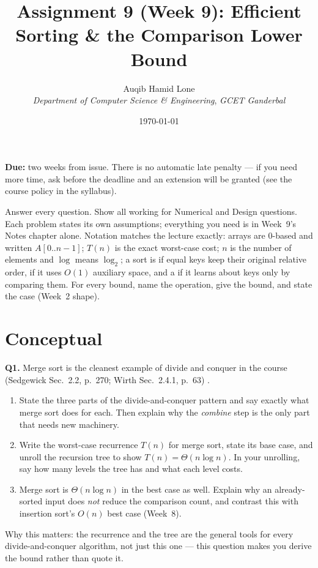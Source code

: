 \documentclass[11pt]{article}
\title{Assignment 9 (Week 9): Efficient Sorting \& the Comparison Lower Bound}
\author{Auqib Hamid Lone\\[0.3em]
  \emph{Department of Computer Science \& Engineering}, \emph{GCET Ganderbal}}
\date{\today}
\begin{document}
\maketitle

\noindent\textbf{Due:} two weeks from issue. There is no automatic late penalty --- if you need more time, ask before the deadline and an extension will be granted (see the course policy in the syllabus).

\noindent Answer every question. Show all working for Numerical and Design questions. Each problem states its own assumptions; everything you need is in Week~9's Notes chapter alone. Notation matches the lecture exactly: arrays are 0-based and written $A[0..n-1]$; $T(n)$ is the exact worst-case cost; $n$ is the number of elements and $\log$ means $\log_2$; a sort is  if equal keys keep their original relative order,  if it uses $O(1)$ auxiliary space, and a  if it learns about keys only by comparing them. For every bound, name the operation, give the bound, and state the case (Week~2 shape).

\section{Conceptual}

\textbf{Q1.} Merge sort is the cleanest example of divide and conquer in the course (Sedgewick Sec.~2.2, p.~270; Wirth Sec.~2.4.1, p.~63) \cite{Sedgewick2011_algorithms,Wirth2004_algorithms_data_structures}.
\begin{enumerate}
  \item[(a)] State the three parts of the divide-and-conquer pattern and say exactly what merge sort does for each. Then explain why the \emph{combine} step is the only part that needs new machinery.
  \item[(b)] Write the worst-case recurrence $T(n)$ for merge sort, state its base case, and unroll the recursion tree to show $T(n)=\Theta(n\log n)$. In your unrolling, say how many levels the tree has and what each level costs.
  \item[(c)] Merge sort is $\Theta(n\log n)$ in the best case as well. Explain why an already-sorted input does \emph{not} reduce the comparison count, and contrast this with insertion sort's $O(n)$ best case (Week~8).
\end{enumerate}
Why this matters: the recurrence and the tree are the general tools for every divide-and-conquer algorithm, not just this one --- this question makes you derive the bound rather than quote it.
\end{document}
